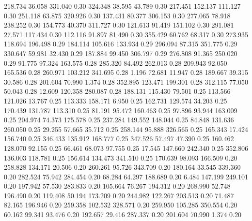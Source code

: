  218.734   36.058  331.040         0.30
 324.348   38.595   43.789         0.30
 217.451  152.137  111.127         0.30
 251.118   63.875  320.926         0.30
 137.431   80.377  306.153         0.30
 277.065   78.918  238.252         0.30
 154.773   40.370  311.727         0.30
 121.613   91.419  151.102         0.30
 291.081   27.571  117.434         0.30
 112.116   91.897   81.490         0.30
 355.429   60.762   68.317         0.30
 273.935  118.694  196.498         0.29
 184.114  105.616  133.934         0.29
 296.094   87.315  351.775         0.29
 330.647   59.981   32.430         0.29
 187.884   99.450  306.797         0.29
 276.808   91.365  250.020         0.29
  91.775   97.324  163.575         0.28
 285.320   84.492  262.013         0.28
 209.943   92.050  165.536         0.28
 260.971  103.212  341.695         0.28
   1.196   72.681   11.947         0.28
 189.667   39.315   30.586         0.28
 201.604   70.990    1.374         0.28
 352.895  123.471  199.301         0.28
 312.115   77.050   50.043         0.28
  12.609  120.358  280.087         0.28
 188.131  115.430   79.501         0.25
 113.566  121.026   13.767         0.25
 113.333  158.171    6.950         0.25
 162.731  129.574   34.203         0.25
 170.439  131.787  113.310         0.25
  81.191   95.472  160.463         0.25
  97.896   93.944  163.009         0.25
 204.974   74.373  175.578         0.25
 237.284  149.552  148.044         0.25
  84.848  131.636  260.050         0.25
  29.255   57.665   35.712         0.25
 258.144   95.888  326.565         0.25
 165.343   17.424  156.740         0.25
 346.433  135.912  168.777         0.25
 347.526   57.497   47.390         0.25
 160.462  128.070   92.155         0.25
  66.461   68.073   97.755         0.25
  17.545  147.660  242.340         0.25
 352.806  136.003  118.781         0.25
 156.614  134.473  341.510         0.25
 170.639   98.093  166.509         0.20
 258.828  134.171   20.506         0.20
 260.261   95.726  343.709         0.20
 180.164   33.545  339.360         0.20
 282.524   75.942  284.454         0.20
  68.284   64.297  188.689         0.20
   6.484  147.199  249.101         0.20
 197.942   57.530  283.833         0.20
 105.664   76.267  194.312         0.20
 268.990   52.748  196.490         0.20
 119.408   50.194  173.209         0.20
 244.982  122.267  203.513         0.20
  71.487   82.165  196.946         0.20
 259.358  102.532  328.571         0.20
 259.950  105.285  350.554         0.20
  60.162   99.341   93.476         0.20
 192.657   29.416  287.337         0.20
 201.604   70.990    1.374         0.20
